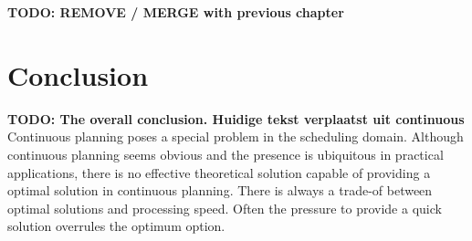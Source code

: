 \documentclass{article}
\newcommand{\TODO}[1]{{\color{red}\textbf{TODO: #1}}}
\begin{document}
\TODO{REMOVE / MERGE with previous chapter}
%
%
%
%
%


\newpage

\section{Conclusion}
\TODO{The overall conclusion.
Huidige tekst verplaatst uit continuous}
Continuous planning poses a special problem in the scheduling domain.
Although continuous planning seems obvious and the presence is ubiquitous in practical applications, there is no effective theoretical solution capable of providing a optimal solution in continuous planning.
There is always a trade-of between optimal solutions and processing speed.
Often the pressure to provide a quick solution overrules the optimum option.

\newpage


\end{document}
